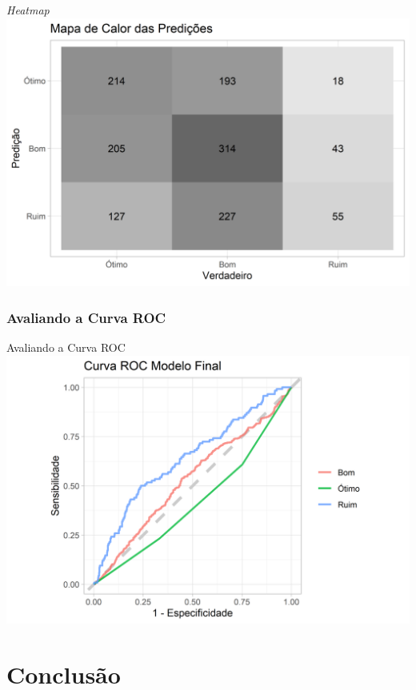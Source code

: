 \documentclass[
  9 pt,
  ignorenonframetext,
]{beamer}
\begin{document}
\begin{frame}{\emph{Heatmap}}
\includegraphics{apresentacao_files/figure-beamer/unnamed-chunk-23-1.png}
\end{frame}

\hypertarget{avaliando-a-curva-roc}{%
\subsubsection{Avaliando a Curva ROC}\label{avaliando-a-curva-roc}}

\begin{frame}{Avaliando a Curva ROC}
\includegraphics{apresentacao_files/figure-beamer/unnamed-chunk-24-1.png}
\end{frame}

\hypertarget{conclusuxe3o}{%
\section{Conclusão}\label{conclusuxe3o}}
\end{document}
